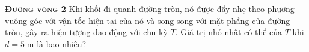 \begin{problem}
{\textbf{\textsc{Đường vòng 2}}} Khi khối đi quanh đường tròn, nó được đẩy nhẹ theo phương vuông góc với vận tốc hiện tại của nó và song song với mặt phẳng của đường tròn, gây ra hiện tượng dao động với chu kỳ $T$. Giá trị nhỏ nhất có thể của $T$ khi $d = 5\;\mathrm{m}$ là bao nhiêu?
\end{problem}
